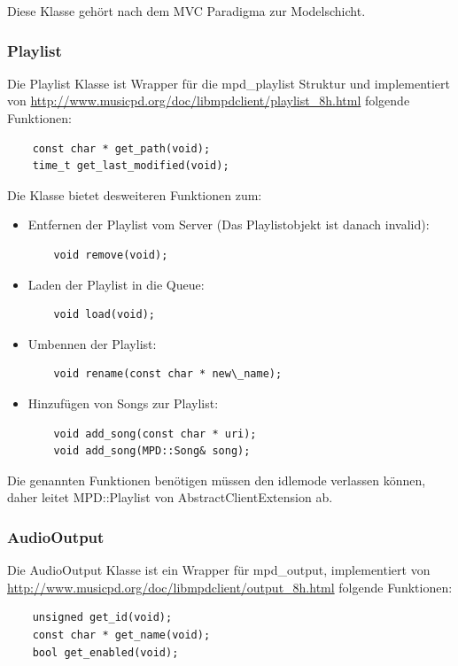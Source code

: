 Diese Klasse gehört nach dem MVC Paradigma zur Modelschicht.

\subsubsection{Playlist}
Die Playlist Klasse ist Wrapper für die mpd\_playlist Struktur und
implementiert von \url{http://www.musicpd.org/doc/libmpdclient/playlist\_8h.html} folgende Funktionen:
\begin{verbatim}
    const char * get_path(void);
    time_t get_last_modified(void);
\end{verbatim}

Die Klasse bietet desweiteren  Funktionen zum:
\begin{itemize}
\item Entfernen der Playlist vom Server (Das Playlistobjekt ist danach invalid):
\begin{verbatim}
    void remove(void);
\end{verbatim}

\item Laden der Playlist in die Queue:
\begin{verbatim}
    void load(void);
\end{verbatim}

\item Umbennen der Playlist:
\begin{verbatim}
    void rename(const char * new\_name);
\end{verbatim}

\item Hinzufügen von Songs zur Playlist:
\begin{verbatim}
    void add_song(const char * uri);
    void add_song(MPD::Song& song);
\end{verbatim}
\end{itemize}
Die genannten Funktionen benötigen müssen den idlemode verlassen können,
daher leitet MPD::Playlist von AbstractClientExtension ab.

\subsubsection{AudioOutput}
Die AudioOutput Klasse ist ein Wrapper für mpd\_output, 
implementiert von \url{http://www.musicpd.org/doc/libmpdclient/output\_8h.html} folgende Funktionen:
\begin{verbatim}
    unsigned get_id(void);
    const char * get_name(void);
    bool get_enabled(void);
\end{verbatim}

